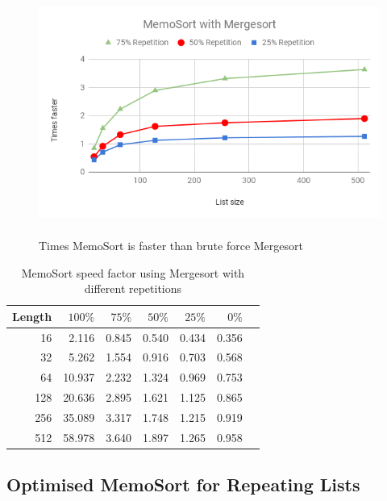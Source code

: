 \documentclass[a4paper,12pt]{article}
\begin{document}
\begin{figure}[H]
    \centering
    \includegraphics[height=8cm,keepaspectratio]{./images/MemoSortMerge.png}
    \caption{Times MemoSort is faster than brute force Mergesort }
    \label{fig:MemoSortMergeGraph}
\end{figure}


\begin{table}[H]
\centering
\begin{tabular}{|r|r|r|r|r|r|r|}   \hline
	{Length} &  {$100\%$} & {$75\%$} & {$50\%$} & {$25\%$} & {$0\%$} \\  \hline
	16 & 2.116&0.845 & 0.540 & 0.434 &0.356\\ 
	32 & 5.262&1.554 & 0.916&0.703& 0.568\\ 
	64 & 10.937 &2.232&1.324&0.969&0.753\\ 
	128 & 20.636&2.895&1.621&1.125&0.865\\ 
	256 & 35.089&3.317&1.748&1.215&0.919\\ 
	512 &  58.978&3.640&1.897&1.265&0.958\\  \hline
\end{tabular}
\caption{MemoSort speed factor using Mergesort with different repetitions}
\label{fig:MemoSortMergeTable}
\end{table}

\subsection{Optimised MemoSort for Repeating Lists}
\end{document}
